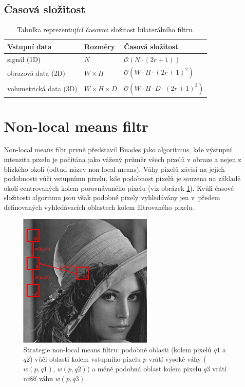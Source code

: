 \subsection*{Časová složitost}
\begin{table}[H]
    \centering
    \begin{tabularx}{1\textwidth}{ 
        >{\raggedright\arraybackslash}X 
        >{\raggedright\arraybackslash}X 
        >{\raggedright\arraybackslash}X }
        Vstupní data & Rozměry & Časová složitost \\
        \hline
        signál (1D) & $N$ & $\mathcal{O}(N \cdot (2r + 1))$ \\ 
        obrazová data (2D) & $W \times H$ & $\mathcal{O}(W \cdot H \cdot (2r + 1)^2)$ \\  
        volumetrická data (3D) & $W \times H \times D$ & $\mathcal{O}(W \cdot H \cdot D \cdot (2r + 1)^3)$
    \end{tabularx}
    \caption{Tabulka reprezentující časovou složitost bilaterálního filtru.}
\end{table}

\newpage

\section{Non-local means filtr}
\label{sec:theory:nlm}
Non-local means filtr prvně představil Buades \cite{nlm2005:buades} jako algoritmus, kde výstupní intenzita pixelu je počítána jako vážený průměr všech pixelů v obraze a nejen z blízkého okolí (odtud název non-local means). Váhy pixelů závisí na jejich podobnosti vůči vstupnímu pixelu, kde podobnost pixelů je souzena na základě okolí centrovaných kolem porovnávaného pixelu (viz obrázek \ref{fig:nlm:strategy}). Kvůli časové složitosti algoritmu jsou však podobné pixely vyhledávány jen v~předem definovaných vyhledávacích oblastech kolem filtrovaného pixelu.

\begin{figure} [H]
    \centering
    \label{fig:nlm:strategy}
    \includegraphics[width=0.6\textwidth]{figures/lena-nlm.png}
    \caption{Strategie non-local means filtru: podobné oblasti (kolem pixelů $q1$ a $q2$) vůči oblasti kolem vstupního pixelu $p$ vrátí vysoké váhy ($w(p,q1)$, $w(p,q2)$) a méně podobná oblast kolem pixelu $q3$ vrátí nižší váhu $w(p,q3)$. }
\end{figure}

